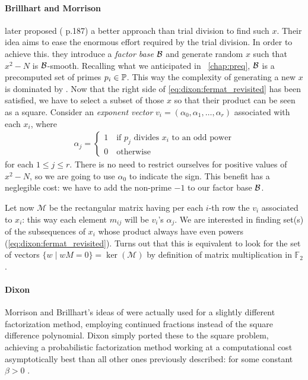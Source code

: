 \paragraph{Brillhart and Morrison} later proposed (\cite{morrison-brillhart}
p.187) a better approach than trial division to find such $x$. Their idea aims
to ease the enormous effort required by the trial division. In order to achieve
this. they introduce a \emph{factor base} $\mathcal{B}$ and generate random $x$
such that $x^2 - N$ is $\mathcal{B}$-smooth. Recalling what we anticipated in
~\ref{chap:preq}, $\mathcal{B}$ is a precomputed set of primes
$p_i \in \mathbb{P}$.
This way the complexity of generating a new $x$ is dominated by
\bigO{|\factorBase|}. Now that the right side of \ref{eq:dixon:fermat_revisited}
has been satisfied, we have to select a subset of those $x$ so that their
product can be seen as a square. Consider an \emph{exponent vector}
$v_i = (\alpha_0, \alpha_1, \ldots, \alpha_r)$ associated with each $x_i$, where
\begin{align}
  \label{eq:dixon:alphas}
  \alpha_j = \begin{cases}
    1 \quad \text{if $p_j$ divides $x_i$ to an odd power} \\
    0 \quad \text{otherwise}
  \end{cases}
\end{align}
for each $1 \leq j \leq r $. There is no need to restrict ourselves for positive
values of $x^2 -N$, so we are going to use $\alpha_0$ to indicate the sign. This
benefit has a neglegible cost: we have to add the non-prime $-1$ to our factor
base $\mathcal{B}$.

Let now $\mathcal{M}$ be the rectangular matrix having per each $i$-th row the
$v_i$ associated to $x_i$: this way each element $m_{ij}$ will be $v_i$'s
$\alpha_j$. We are interested in finding set(s) of the subsequences of $x_i$
whose product always have even powers (\ref{eq:dixon:fermat_revisited}).
Turns out that this is equivalent to look for the set of vectors
$\{ w \mid wM = 0 \} = \ker(\mathcal{M})$ by definition of matrix multiplication
in $\mathbb{F}_2$.


\paragraph{Dixon} Morrison and Brillhart's ideas of \cite{morrison-brillhart}
were actually used for a slightly different factorization method, employing
continued fractions instead of the square difference polynomial. Dixon simply
ported these to the square problem, achieving a probabilistic factorization
method working at a computational cost asymptotically  best than all other ones
previously described:  for some
constant $\beta > 0$ \cite{dixon}.

